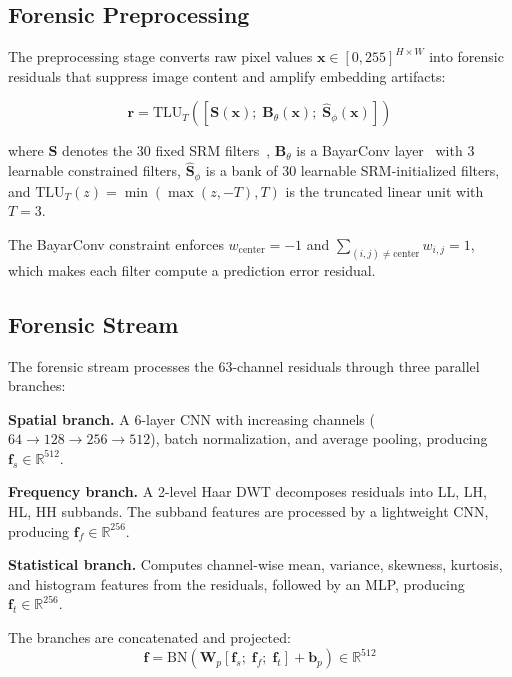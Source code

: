 \documentclass[conference]{IEEEtran}
\begin{document}
\subsection{Forensic Preprocessing}
\label{sec:preprocessing}

The preprocessing stage converts raw pixel values $\mathbf{x} \in [0, 255]^{H \times W}$ into forensic residuals that suppress image content and amplify embedding artifacts:

\begin{equation}
  \mathbf{r} = \text{TLU}_T\left(\left[\mathbf{S}(\mathbf{x});\; \mathbf{B}_\theta(\mathbf{x});\; \hat{\mathbf{S}}_\phi(\mathbf{x})\right]\right)
  \label{eq:preprocessing}
\end{equation}

where $\mathbf{S}$ denotes the 30 fixed SRM filters~\cite{fridrich2012rich}, $\mathbf{B}_\theta$ is a BayarConv layer~\cite{bayar2018constrained} with 3 learnable constrained filters, $\hat{\mathbf{S}}_\phi$ is a bank of 30 learnable SRM-initialized filters, and $\text{TLU}_T(z) = \min(\max(z, -T), T)$ is the truncated linear unit with $T = 3$.

The BayarConv constraint enforces $w_{\text{center}} = -1$ and $\sum_{(i,j) \neq \text{center}} w_{i,j} = 1$, which makes each filter compute a prediction error residual.

\subsection{Forensic Stream}
\label{sec:forensic}

The forensic stream processes the 63-channel residuals through three parallel branches:

\textbf{Spatial branch.}
A 6-layer CNN with increasing channels ($64 \to 128 \to 256 \to 512$), batch normalization, and average pooling, producing $\mathbf{f}_s \in \mathbb{R}^{512}$.

\textbf{Frequency branch.}
A 2-level Haar DWT decomposes residuals into LL, LH, HL, HH subbands. The subband features are processed by a lightweight CNN, producing $\mathbf{f}_f \in \mathbb{R}^{256}$.

\textbf{Statistical branch.}
Computes channel-wise mean, variance, skewness, kurtosis, and histogram features from the residuals, followed by an MLP, producing $\mathbf{f}_t \in \mathbb{R}^{256}$.

The branches are concatenated and projected:
\begin{equation}
  \mathbf{f} = \text{BN}(\mathbf{W}_p [\mathbf{f}_s;\; \mathbf{f}_f;\; \mathbf{f}_t] + \mathbf{b}_p) \in \mathbb{R}^{512}
  \label{eq:forensic}
\end{equation}
\end{document}
